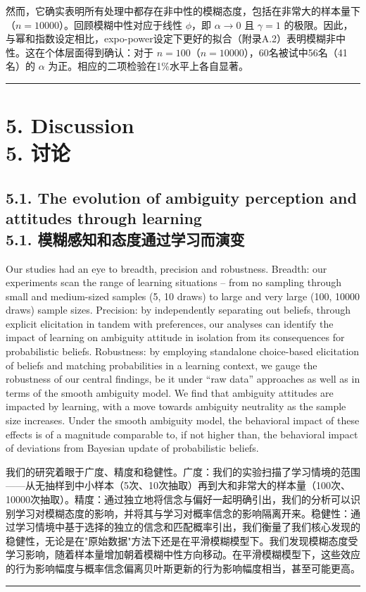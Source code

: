 \documentclass[12pt,a4paper]{article}
\newenvironment{original}
  {\par\vspace{0.5em}\noindent\color{black}\ignorespaces}
  {\par\vspace{0.3em}}
\newenvironment{translation}
  {\par\noindent\color{transblue}\ignorespaces}
  {\par\vspace{0.8em}\hrule\vspace{0.5em}}
\newcommand{\bilingualsection}[2]{%
  \section{\texorpdfstring{#1 \\[0.3em] {\large\color{transblue}#2}}{#1}}
}
\newcommand{\bilingualsubsection}[2]{%
  \subsection{\texorpdfstring{#1 \\[0.2em] {\normalsize\color{transblue}#2}}{#1}}
}
\begin{document}
\begin{translation}
然而，它确实表明所有处理中都存在非中性的模糊态度，包括在非常大的样本量下（$n = 10000$）。回顾模糊中性对应于线性 $\phi$，即 $\alpha \to 0$ 且 $\gamma = 1$ 的极限。因此，与幂和指数设定相比，expo-power设定下更好的拟合（附录A.2）表明模糊非中性。这在个体层面得到确认：对于 $n = 100$（$n = 10000$），60名被试中56名（41名）的 $\alpha$ 为正。相应的二项检验在1\%水平上各自显著。
\end{translation}
\bilingualsection{5. Discussion}{5. 讨论}

\bilingualsubsection{5.1. The evolution of ambiguity perception and attitudes through learning}{5.1. 模糊感知和态度通过学习而演变}

\begin{original}
Our studies had an eye to breadth, precision and robustness. Breadth: our experiments scan the range of learning situations -- from no sampling through small and medium-sized samples (5, 10 draws) to large and very large (100, 10000 draws) sample sizes. Precision: by independently separating out beliefs, through explicit elicitation in tandem with preferences, our analyses can identify the impact of learning on ambiguity attitude in isolation from its consequences for probabilistic beliefs. Robustness: by employing standalone choice-based elicitation of beliefs and matching probabilities in a learning context, we gauge the robustness of our central findings, be it under ``raw data'' approaches as well as in terms of the smooth ambiguity model. We find that ambiguity attitudes are impacted by learning, with a move towards ambiguity neutrality as the sample size increases. Under the smooth ambiguity model, the behavioral impact of these effects is of a magnitude comparable to, if not higher than, the behavioral impact of deviations from Bayesian update of probabilistic beliefs.
\end{original}

\begin{translation}
我们的研究着眼于广度、精度和稳健性。广度：我们的实验扫描了学习情境的范围——从无抽样到中小样本（5次、10次抽取）再到大和非常大的样本量（100次、10000次抽取）。精度：通过独立地将信念与偏好一起明确引出，我们的分析可以识别学习对模糊态度的影响，并将其与学习对概率信念的影响隔离开来。稳健性：通过学习情境中基于选择的独立的信念和匹配概率引出，我们衡量了我们核心发现的稳健性，无论是在"原始数据"方法下还是在平滑模糊模型下。我们发现模糊态度受学习影响，随着样本量增加朝着模糊中性方向移动。在平滑模糊模型下，这些效应的行为影响幅度与概率信念偏离贝叶斯更新的行为影响幅度相当，甚至可能更高。
\end{translation}
\end{document}
